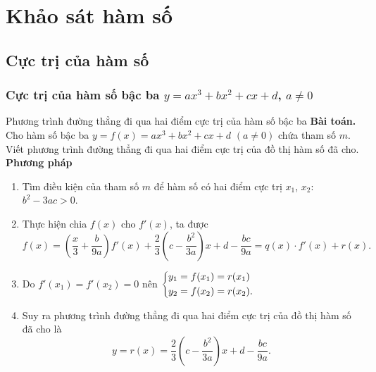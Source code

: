 
\chapter{Khảo sát hàm số}
\section{Cực trị của hàm số}
\subsection{Cực trị của hàm số bậc ba $y=ax^3+bx^2+cx+d$, $a\ne0$}
\begin{dang}{Phương trình đường thẳng đi qua hai điểm cực trị của hàm số bậc ba}
	\textbf{Bài toán.} Cho hàm số bậc ba $y = f(x) = ax^3 + bx^2 + cx + d$ $(a \neq 0)$ chứa tham số $m$. Viết phương trình đường thẳng đi qua hai điểm cực trị của đồ thị hàm số đã cho.\\
	\textbf{Phương pháp}
	\def\listEXenumi{\protect\circled{\color{blue} \textbf{\arabic{enumi}}}}
	\begin{enumerate}
		\item Tìm điều kiện của tham số $m$ để hàm số có hai điểm cực trị $x_1$, $x_2$: $b^2 - 3ac > 0$.
		\item Thực hiện chia $f(x)$ cho $f'(x)$, ta được
		$$f(x) = \left(\dfrac{x}{3} + \dfrac{b}{9a}\right)f'(x) + \dfrac{2}{3}\left(c - \dfrac{b^2}{3a}\right)x + d - \dfrac{bc}{9a} = q(x) \cdot f'(x) + r(x).$$
		\item Do $f'(x_1) = f'(x_2) = 0$ nên $\left\{\begin{aligned}&y_1 = f(x_1) = r(x_1) \\ &y_2 = f(x_2) = r(x_2).\end{aligned}\right.$
		\item Suy ra phương trình đường thẳng đi qua hai điểm cực trị của đồ thị hàm số đã cho là					
		$$y = r(x) = \dfrac{2}{3}\left(c - \dfrac{b^2}{3a}\right)x + d - \dfrac{bc}{9a}.$$			
	\end{enumerate}
\end{dang}

